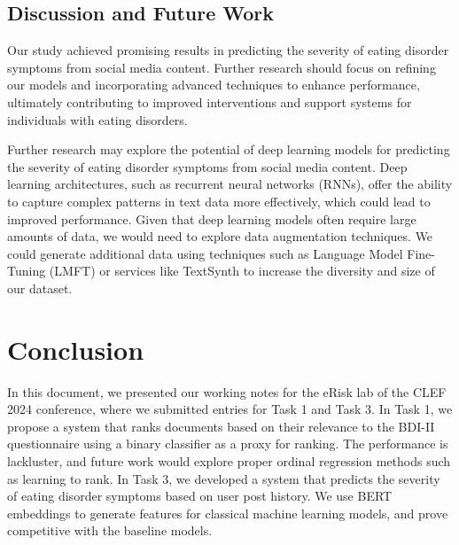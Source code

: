 \documentclass[]{style/ceurart}
\begin{document}


\subsection{Discussion and Future Work}

Our study achieved promising results in predicting the severity of eating disorder symptoms from social media content. 
Further research should focus on refining our models and incorporating advanced techniques to enhance performance, ultimately contributing to improved interventions and support systems for individuals with eating disorders.

Further research may explore the potential of deep learning models for predicting the severity of eating disorder symptoms from social media content. 
Deep learning architectures, such as recurrent neural networks (RNNs), offer the ability to capture complex patterns in text data more effectively, which could lead to improved performance.
Given that deep learning models often require large amounts of data, we would need to explore data augmentation techniques. 
We could generate additional data using techniques such as Language Model Fine-Tuning (LMFT) or services like TextSynth to increase the diversity and size of our dataset.


\section{Conclusion}

In this document, we presented our working notes for the eRisk lab of the CLEF 2024 conference, where we submitted entries for Task 1 and Task 3.
In Task 1, we propose a system that ranks documents based on their relevance to the BDI-II questionnaire using a binary classifier as a proxy for ranking.
The performance is lackluster, and future work would explore proper ordinal regression methods such as learning to rank.
In Task 3, we developed a system that predicts the severity of eating disorder symptoms based on user post history.
We use BERT embeddings to generate features for classical machine learning models, and prove competitive with the baseline models.
\end{document}
